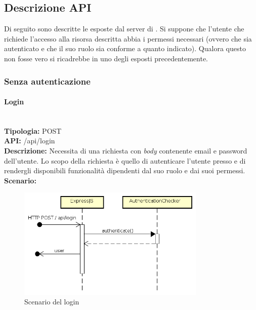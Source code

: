 \subsection{Descrizione API}
Di seguito sono descritte le   esposte dal server di . Si suppone che l'utente che richiede l'accesso alla risorsa descritta abbia i permessi necessari (ovvero che sia autenticato e che il suo ruolo sia conforme a quanto indicato). Qualora questo non fosse vero si ricadrebbe in uno degli  esposti precedentemente.
\subsubsection{Senza autenticazione}
\paragraph{Login}\mbox{}\\
\textbf{Tipologia:} POST \\
\textbf{API:} /api/login \\
\textbf{Descrizione:} Necessita di una richiesta con \textit{body} contenente email e password dell'utente. Lo scopo della richiesta è quello di autenticare l'utente presso  e di rendergli disponibili funzionalità dipendenti dal suo ruolo e dai suoi permessi. \\
\textbf{Scenario:} 
\begin{figure}[H]
\centering
\includegraphics[width=0.8\textwidth]{res/sections/backend/sequence/(POST)login.png}
\caption{Scenario del login}
\end{figure}

\newpage
